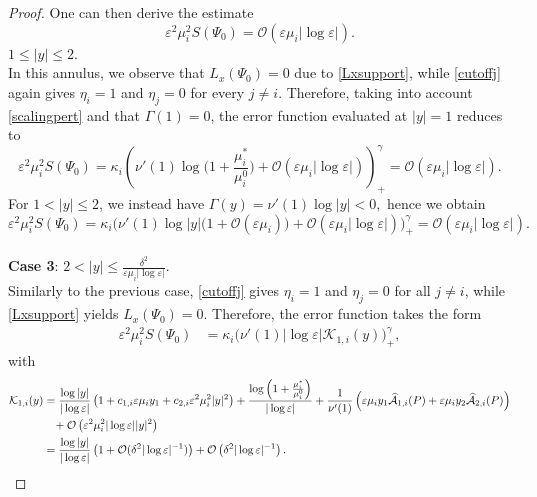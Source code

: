 \documentclass[11pt,reqno,a4paper]{amsart}
\numberwithin{equation}{section}
\newcommand{\ve}{\varepsilon}
\begin{document}
\begin{proof}
One can then derive the estimate 
\begin{equation*}
\ve^2\mu_i^2 S(\Psi_{0})=\mathcal{O}\left(\ve\mu_i|\log\ve|\right).
\end{equation*}
 $1 \leq |y| \leq 2.$
\\
In this annulus, we observe that $L_x(\Psi_0)=0$ due to \eqref{Lxsupport}, while \eqref{cutoffj} again gives $\eta_i=1$ and $\eta_j=0$ for every $j\neq i$. 
Therefore, taking into account  \eqref{scalingpert} and that $\Gamma(1)=0$, the error function evaluated at $|y|=1$ reduces to
\begin{equation*}
\ve^2\mu_i^2 S(\Psi_0) =\kappa_i\left(\nu'(1)\log\Big(1+\frac{\mu_i^{*}}{\mu_i^0}\Big)+\mathcal{O}(\ve\mu_i|\log\ve|)\right)^{\gamma}_{+} =\mathcal{O}\left(\ve\mu_i|\log\ve|\right).
\end{equation*}
For $1<|y|\leq 2$, we instead have $\Gamma(y)=\nu'(1)\log|y|<0,$ hence we obtain
\[\ve^2\mu_i^2S(\Psi_0)=\kappa_i\Big(\nu'(1)\log|y|\big(1+\mathcal{O}(\ve\mu_i)\big)+\mathcal{O}\left(\ve\mu_i|\log\ve|\right)\Big)^{\gamma}_{+}=\mathcal{O}\left(\ve\mu_i|\log\ve|\right).\]
\\
\textbf{Case 3}: $2 < |y| \leq \frac{\delta^2}{\ve\mu_i|\log\ve|}.$
\\
Similarly to the previous case, \eqref{cutoffj} gives $\eta_{i}=1$ and $\eta_j=0$ for all $j\neq i$, while \eqref{Lxsupport}
yields $L_x(\Psi_0)=0$. Therefore, the error function takes the form
\begin{equation*}
\begin{aligned}
\ve^2\mu_i^2 S\left(\Psi_{0}\right)&=\kappa_i\Big(\nu'(1)|\log\ve|\mathcal{K}_{1,i}(y)\Big)^{\gamma}_{+},
\end{aligned}
\end{equation*}
with
\begin{equation}\label{functK1}
\begin{aligned}
\mathcal{K}_{1,i}(y)&=\frac{\log|y|}{|\log\ve|}\left(1+c_{1,i}\ve\mu_i y_1 +c_{2,i}\ve^2\mu_i^2|y|^2\right)+\frac{\log\left(1+\frac{\mu_i^{*}}{\mu_i^0}\right)}{|\log\ve|}+\frac{1}{\nu'(1)}\left(\ve\mu_i y_1 \widehat{\mathcal{A}}_{1,i}(P)+\ve\mu_i y_2\widehat{\mathcal{A}}_{2,i}(P)\right)\\
&\hspace{3mm}+\mathcal{O}\left(\ve^2\mu_i^2|\log\ve||y|^2\right)\\
&=\frac{\log|y|}{|\log\ve|}\left(1+\mathcal{O}(\delta^2|\log\ve|^{-1})\right) + \mathcal{O}\left(\delta^2|\log\ve|^{-1}\right).
\end{aligned}

\end{equation}
\end{proof}
\end{document}
